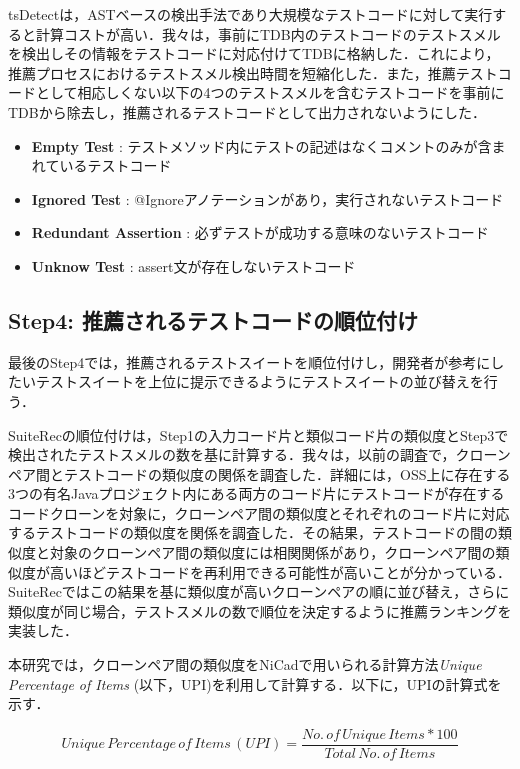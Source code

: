 \documentclass[12pt]{jarticle} %
\begin{document}
{\sf tsDetect}は，ASTベースの検出手法であり大規模なテストコードに対して実行すると計算コストが高い．我々は，事前にTDB内のテストコードのテストスメルを検出しその情報をテストコードに対応付けてTDBに格納した．これにより，推薦プロセスにおけるテストスメル検出時間を短縮化した．また，推薦テストコードとして相応しくない以下の4つのテストスメルを含むテストコードを事前にTDBから除去し，推薦されるテストコードとして出力されないようにした．

\begin{itemize}
\item \textbf{Empty Test} : テストメソッド内にテストの記述はなくコメントのみが含まれているテストコード
\item \textbf{Ignored Test} : @Ignoreアノテーションがあり，実行されないテストコード
\item \textbf{Redundant Assertion} : 必ずテストが成功する意味のないテストコード
\item \textbf{Unknow Test} : assert文が存在しないテストコード
\end{itemize}

\subsection{Step4: 推薦されるテストコードの順位付け}

最後のStep4では，推薦されるテストスイートを順位付けし，開発者が参考にしたいテストスイートを上位に提示できるようにテストスイートの並び替えを行う．

{\sf SuiteRec}の順位付けは，Step1の入力コード片と類似コード片の類似度とStep3で検出されたテストスメルの数を基に計算する．我々は，以前の調査\cite{fose2019}で，クローンペア間とテストコードの類似度の関係を調査した．詳細には，OSS上に存在する3つの有名Javaプロジェクト内にある両方のコード片にテストコードが存在するコードクローンを対象に，クローンペア間の類似度とそれぞれのコード片に対応するテストコードの類似度を関係を調査した．その結果，テストコードの間の類似度と対象のクローンペア間の類似度には相関関係があり，クローンペア間の類似度が高いほどテストコードを再利用できる可能性が高いことが分かっている．{\sf SuiteRec}ではこの結果を基に類似度が高いクローンペアの順に並び替え，さらに類似度が同じ場合，テストスメルの数で順位を決定するように推薦ランキングを実装した．

本研究では，クローンペア間の類似度を{\sf NiCad}で用いられる計算方法{\it Unique Percentage of Items} (以下，UPI)を利用して計算する．以下に，UPIの計算式を示す．

\[
  Unique\, Percentage\, of\, Items\, (UPI) =
  \frac{No.\, of\, Unique\, Items * 100}{Total\, No.\, of\, Items}
\]
\end{document}
